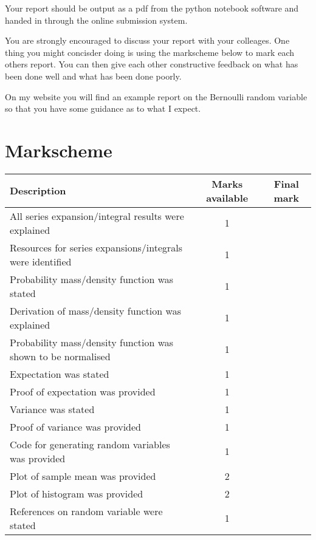 \documentclass[paper=a4, fontsize=11pt]{scrartcl}
\numberwithin{equation}{section}
\numberwithin{figure}{section}
\numberwithin{table}{section}
\begin{document}
Your report should be output as a pdf from the python notebook software and handed in through the online submission system.

You are strongly encouraged to discuss your report with your colleages.  One thing you might concisder doing is using the markscheme below to mark each others report.  You can then give each other 
constructive feedback on what has been done well and what has been done poorly.

On my website you will find an example report on the Bernoulli random variable so that you have some guidance as to what I expect.

\section{Markscheme}

\begin{center}
\begin{tabular}{ l | c | c }
Description & Marks available & Final mark \\ \hline
All series expansion/integral results were explained & 1 &  \\
Resources for series expansions/integrals were identified & 1 & \\
Probability mass/density function was stated & 1 & \\
Derivation of mass/density function was explained & 1 & \\
Probability mass/density function was shown to be normalised & 1 & \\
Expectation was stated & 1 & \\
Proof of expectation was provided & 1 & \\
Variance was stated & 1 & \\
Proof of variance was provided & 1 &  \\
Code for generating random variables was provided & 1 & \\
Plot of sample mean was provided & 2 & \\
Plot of histogram was provided & 2 & \\
References on random variable were stated & 1 & 
\end{tabular}
\end{center}
\end{document}
